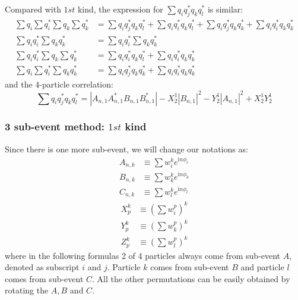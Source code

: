 Compared with $1st$ kind, the expression for $\sum q_{i}^{}q_{j}^{*}q_{k}^{}q_{l}^{*}$ is similar:
\begin{equation}
\begin{split}
\sum q_{i}^{} \sum q_{i}^{*} \sum q_{k}^{} \sum q_{k}^{*} &= \sum q_{i}^{}q_{j}^{*}q_{k}^{}q_{l}^{*} + \sum q_{i}^{}q_{i}^{*}q_{k}^{}q_{l}^{*} + \sum q_{i}^{}q_{j}^{*}q_{k}^{}q_{k}^{*} + \sum q_{i}^{}q_{i}^{*}q_{k}^{}q_{k}^{*} \\
\sum q_{i}^{}q_{i}^{*} \sum q_{k}^{}q_{k}^{*} &= \sum q_{i}^{}q_{i}^{*} \sum q_{k}^{}q_{k}^{*} \\
\sum q_{i}^{}q_{i}^{*} \sum q_{k}^{} \sum q_{k}^{*} &= \sum q_{i}^{}q_{i}^{*}q_{k}^{}q_{l}^{*} + \sum q_{i}^{}q_{i}^{*}q_{k}^{}q_{k}^{*} \\
\sum q_{i}^{} \sum q_{i}^{*} \sum q_{k}^{}q_{k}^{*} &= \sum q_{i}^{}q_{j}^{*}q_{k}^{}q_{k}^{*} + \sum q_{i}^{}q_{i}^{*}q_{k}^{}q_{k}^{*}
\end{split}
\end{equation}
and the 4-particle correlation:
\begin{equation}
\sum q_{i}^{}q_{j}^{*}q_{k}^{}q_{l}^{*} = |A_{n,1}^{}A_{n,1}^{*}B_{n,1}^{}B_{n,1}^{*}|-X_{2}^{1}|B_{n,1}|^{2}-Y_{2}^{1}|A_{n,1}|^{2}+X_{2}^{1}Y_{2}^{1}
\end{equation}

\subsubsection{3 sub-event method: $1st$ kind}
Since there is one more sub-event, we will change our notations as:
\begin{equation}
\begin{split}
A_{n,k}&\equiv \sum w_{i}^{k}e^{\text{i}n\phi_{i}} \\
B_{n,k}&\equiv \sum w_{k}^{k}e^{\text{i}n\phi_{k}} \\
C_{n,k}&\equiv \sum w_{l}^{k}e^{\text{i}n\phi_{l}}
\end{split}
\end{equation}
\begin{equation}
\begin{split}
X_{p}^{k}&\equiv (\sum w_{i}^{p})^{k} \\
Y_{p}^{k}&\equiv (\sum w_{k}^{p})^{k} \\
Z_{p}^{k}&\equiv (\sum w_{l}^{p})^{k}
\end{split}
\end{equation}
where in the following formulas 2 of 4 particles always come from sub-event $A$, denoted as subscript $i$ and $j$. Particle $k$ comes from sub-event $B$ and particle $l$ comes from sub-event $C$. All the other permutations can be easily obtained by rotating the $A,B$ and $C$.

